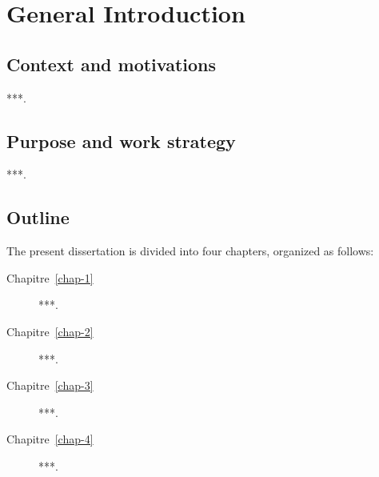 \chapter*{General Introduction}
{}

\section*{Context and motivations}
***.

\section*{Purpose and work strategy}
***.

\section*{Outline}
The present dissertation is divided into four chapters, organized as follows:

\begin{description}
	\item[Chapitre~\ref{chap-1}] ***.
	\item[Chapitre~\ref{chap-2}] ***.
	\item[Chapitre~\ref{chap-3}] ***.
	\item[Chapitre~\ref{chap-4}] ***.
\end{description}